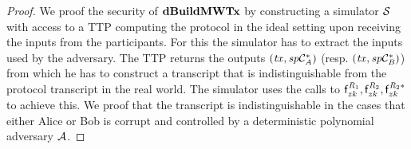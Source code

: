\begin{proof} \label{prf:atom:sec-dbuildmw}
    We proof the security of $\mathbf{dBuildMWTx}$ by constructing a simulator $\mathcal{S}$ with access to a TTP computing the protocol in the ideal setting upon receiving the inputs from the participants.
    For this the simulator has to extract the inputs used by the adversary.
    The TTP returns the outputs $(\mathit{tx}, \mathit{sp}\mathcal{C}_{\mathit{A}}^*)$ (resp. $(\mathit{tx}, \mathit{sp}\mathcal{C}_{\mathit{B}}^*)$) from which he has to construct a transcript that is indistinguishable from the protocol transcript in the real world. The simulator uses the calls to $\mathsf{f}^{\mathit{R}_1}_{zk}, \mathsf{f}^{\mathit{R}_2}_{zk}, \mathsf{f}^{\mathit{R}_2*}_{zk}$ to achieve this.
    We proof that the transcript is indistinguishable in the cases that either Alice or Bob is corrupt and controlled by a deterministic polynomial adversary $\mathcal{A}$.


\end{proof}

